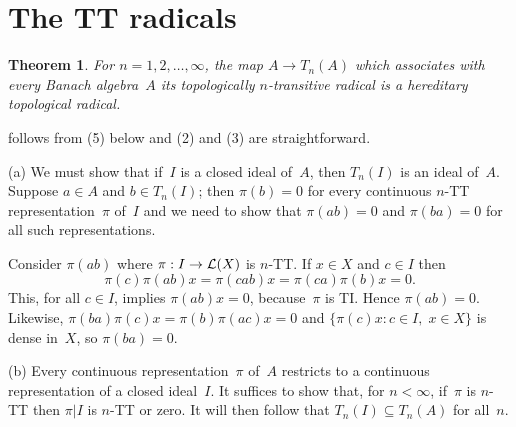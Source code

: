\documentclass[11pt]{article}
\newcounter{arbenum}
\newenvironment{arbenumerate}{\begin{list}{{\rm(\arabic{arbenum})}}%
{\usecounter{arbenum}}}{\end{list}}
\newcommand{\sseq}{\subseteq}
\newcommand{\nin}{\not\in}
\newcommand{\onto}{\twoheadrightarrow}
\newtheorem{thm}{Theorem}[section]
\newenvironment{Proof}{{\it Proof. }}{}%
\newcommand{\detail}[1]{}
\newcommand{\Detail}[1]{}
\newcommand{\LX}{{\cal L}(X)}
\begin{document}
\section{The TT radicals}\label{S6}


\begin{thm}\label{T5}
For $n = 1,2,\dots,\infty$, the map $A \to T_n(A)$ which associates with
every Banach algebra~$A$ its topologically $n$-transitive radical is a
hereditary topological radical.
\end{thm}

\begin{Proof}
\begin{arbenumerate}
\item follows from (5) below and (2) and (3) are straightforward.
\Detail{For (2) we observe that
every continuous $n$-TT representation $\pi:A \to \LX$ induces a continuous
$n$-TT representation $\tilde\pi:A/T_n(A) \to \LX$ with kernel $(\ker\pi)/T_n(A)$.
Therefore the intersection of all the kernels of continuous $n$-TT representations
of $A/T_n(A)$ is zero.

To show (3), we argue that if $\phi:A \onto B$ is a continuous epimorphism, then
every continuous $n$-TT representation $\pi:B \to \LX$ induces a continuous
representation $\pi\phi:A \to \LX$, which is $n$-TT (because~$\phi$ is
surjective).  The intersection of the kernels of these representations of~$A$ is
$\phi^{-1}(T_n(B))$.   Thus $T_n(A)\sseq\phi^{-1}(T_n(B))$, whence
$\phi(T_n(A))\sseq T_n(B)$.}
\addtocounter{arbenum}{2}
\item(a)
We must show that if~$I$ is a closed ideal of~$A$, then  $T_n(I)$ is an ideal
of~$A$.   Suppose $a\in A$ and $b\in T_n(I)$; then $\pi(b) = 0$ for every
continuous $n$-TT representation~$\pi$ of~$I$ and we need to show that
$\pi(ab) = 0$ and $\pi(ba) = 0$ for all such representations.

Consider $\pi(ab)$ where $\pi:I \to \LX$ is $n$-TT.  If $x \in X$ and $c \in I$
then
$$\pi(c)\pi(ab)x = \pi(cab)x = \pi(ca)\pi(b)x = 0.$$
This, for all $c\in I$, implies $\pi(ab)x=0$, because~$\pi$ is TI.   Hence
$\pi(ab) = 0$.  Likewise, $\pi(ba)\pi(c)x = \pi(b)\pi(ac)x = 0$ and
$\{\pi(c)x: c \in I,\; x\in X\}$ is dense in~$X$, so $\pi(ba)=0$.
\addtocounter{arbenum}{-1}
\item(b)
Every continuous representation~$\pi$ of~$A$ restricts to a continuous
representation of a closed ideal~$I$.  It suffices to show that, for $n < \infty$,
if~$\pi$ is $n$-TT then $\pi|I$ is $n$-TT or zero.    It will then follow that
$T_n(I) \sseq T_n(A)$ for all~$n$. \detail{If $a \in I\setminus T_n(A)$, then
there is a continuous $n$-TT representation~$\pi$ such that $\pi(a) \neq 0$, so
$\pi|I$ is a continuous $n$-TT representation of~$I$ with $(\pi|I)(a) \neq 0$,
so $a \nin T_n(I)$.}


\end{arbenumerate}
\end{Proof}
\end{document}
